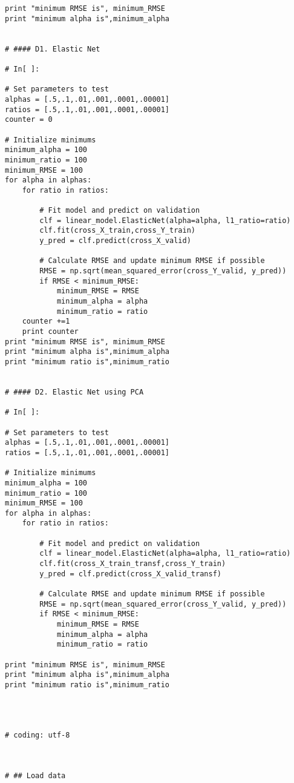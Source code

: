 \documentclass[11pt, oneside]{article}   	%
\begin{document}
\begin{lstlisting}
print "minimum RMSE is", minimum_RMSE
print "minimum alpha is",minimum_alpha


# #### D1. Elastic Net

# In[ ]:

# Set parameters to test
alphas = [.5,.1,.01,.001,.0001,.00001] 
ratios = [.5,.1,.01,.001,.0001,.00001]
counter = 0

# Initialize minimums
minimum_alpha = 100
minimum_ratio = 100
minimum_RMSE = 100
for alpha in alphas:
    for ratio in ratios:
        
        # Fit model and predict on validation
        clf = linear_model.ElasticNet(alpha=alpha, l1_ratio=ratio)
        clf.fit(cross_X_train,cross_Y_train)
        y_pred = clf.predict(cross_X_valid) 
        
        # Calculate RMSE and update minimum RMSE if possible
        RMSE = np.sqrt(mean_squared_error(cross_Y_valid, y_pred))
        if RMSE < minimum_RMSE:
            minimum_RMSE = RMSE
            minimum_alpha = alpha
            minimum_ratio = ratio
    counter +=1
    print counter
print "minimum RMSE is", minimum_RMSE
print "minimum alpha is",minimum_alpha
print "minimum ratio is",minimum_ratio


# #### D2. Elastic Net using PCA

# In[ ]:

# Set parameters to test
alphas = [.5,.1,.01,.001,.0001,.00001] 
ratios = [.5,.1,.01,.001,.0001,.00001]

# Initialize minimums
minimum_alpha = 100
minimum_ratio = 100
minimum_RMSE = 100
for alpha in alphas:
    for ratio in ratios:
        
        # Fit model and predict on validation
        clf = linear_model.ElasticNet(alpha=alpha, l1_ratio=ratio)
        clf.fit(cross_X_train_transf,cross_Y_train)
        y_pred = clf.predict(cross_X_valid_transf) 
        
        # Calculate RMSE and update minimum RMSE if possible
        RMSE = np.sqrt(mean_squared_error(cross_Y_valid, y_pred))
        if RMSE < minimum_RMSE:
            minimum_RMSE = RMSE
            minimum_alpha = alpha
            minimum_ratio = ratio

print "minimum RMSE is", minimum_RMSE
print "minimum alpha is",minimum_alpha
print "minimum ratio is",minimum_ratio




# coding: utf-8



# ## Load data


\end{lstlisting}
\end{document}
